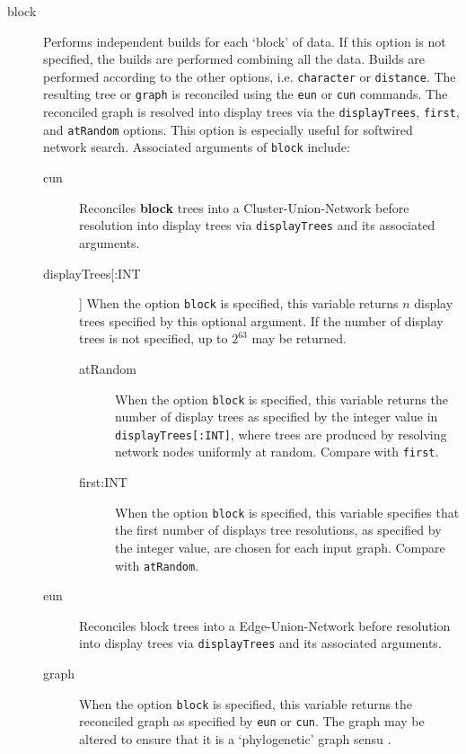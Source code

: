 	\begin{description}
		\item[block] Performs independent builds for each `block' of data. If this option 
		is not specified, the builds are performed combining all the data. Builds are performed 
		according 	to the other options, i.e. \texttt{character} or \texttt{distance}. The resulting tree 
		or \texttt{graph} is reconciled using the \texttt{eun} or \texttt{cun} commands. The 
		reconciled graph is resolved into display trees via the \texttt{displayTrees}, \texttt{first}, 
		and \texttt{atRandom} options. This option is especially useful for softwired network search. 
		Associated arguments of \texttt{block} include:
				
		\begin{description}			
			\item[cun] Reconciles \textbf {block} trees into a Cluster-Union-Network \citep{Baroni2005} 
			before resolution into display trees via \texttt{displayTrees} and its associated arguments.
	
			\item[displayTrees[:INT]] When the option \texttt{block} is specified, this variable 
			returns $n$ display trees specified by this optional argument. If the number of 
			display trees is not specified, up to $2^{63}$ may be returned.
				
				\begin{description}
				\item[atRandom] When the option \texttt{block} is specified, this variable returns the
				number of display trees as specified by the integer value in \texttt{displayTrees[:INT]}, where 
				trees are produced by resolving network nodes uniformly at random. Compare with 
				\texttt{first}.
				
				\item[first:INT] When the option \texttt{block} is specified, this variable specifies 
				that the first number of displays tree resolutions, as specified by the integer value, 
				are chosen for each input graph. Compare with \texttt{atRandom}.
				\end{description}


			\item[eun] Reconciles block trees into a Edge-Union-Network \citep{MiyagiandWheeler2019, 
			Wheeler2022} before resolution into display trees via \texttt{displayTrees} and its associated 
			arguments.
						
			\item[graph] When the option \texttt{block} is specified, this variable returns the 
			reconciled graph as specified by \texttt{eun} or \texttt{cun}. The graph may be 
			altered to ensure that it is a `phylogenetic' graph sensu \cite{Moretetal2005}.
		\end{description}			
		

\end{description}
